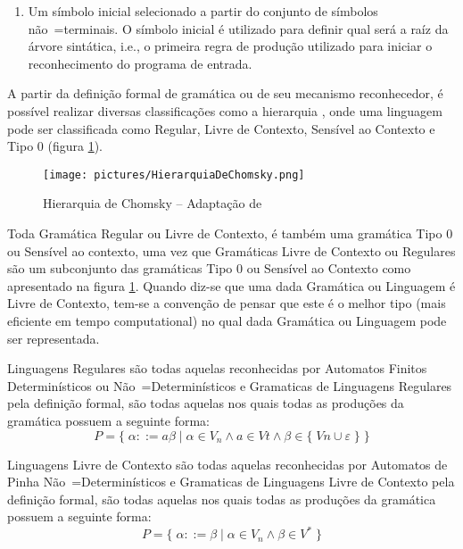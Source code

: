 {\begin{enumerate}
        \item Um símbolo inicial selecionado a partir do conjunto de símbolos não~=terminais.
        O símbolo inicial é utilizado para definir qual será a raíz da árvore sintática,
        i.e.,
        o primeira regra de produção utilizado para iniciar o reconhecimento do programa de entrada.
    \end{enumerate}

    A partir da definição formal de gramática ou de seu mecanismo reconhecedor,
    é possível realizar diversas classificações como a
    hierarquia ,
    onde uma linguagem pode ser classificada como Regular,
    Livre de Contexto,
    Sensível ao Contexto e
    Tipo 0 (figura \ref{fig:pictures/HierarquiaDeChomsky.png}).
    \begin{figure}[H]
    \centering
    \texttt{[image: pictures/HierarquiaDeChomsky.png]}
    \caption{Hierarquia de Chomsky -- Adaptação de }
    \label{fig:pictures/HierarquiaDeChomsky.png}
    \end{figure}

    Toda Gramática Regular ou Livre de Contexto,
    é também uma gramática Tipo 0 ou Sensível ao contexto,
    uma vez que Gramáticas Livre de Contexto ou Regulares são um
    subconjunto das gramáticas Tipo 0 ou Sensível ao Contexto como
    apresentado na figura \ref{fig:pictures/HierarquiaDeChomsky.png}.
    Quando diz-se que uma dada Gramática ou Linguagem é Livre de Contexto,
    tem-se a convenção de pensar que este é o melhor tipo (mais eficiente em tempo
    computational) no qual dada Gramática ou Linguagem pode ser representada.

    Linguagens Regulares são todas aquelas reconhecidas por
    Automatos Finitos Determinísticos ou
    Não~=Determinísticos e
    Gramaticas de Linguagens Regulares pela definição formal,
    são todas aquelas nos quais todas as produções da gramática possuem a seguinte forma:
    $$ P = \{\; \alpha ::= a \beta \;|\; \alpha \in V_n \land a \in Vt
                \land \beta \in \{\; Vn \cup \varepsilon\; \} \;\} $$

    Linguagens Livre de Contexto são todas aquelas
    reconhecidas por Automatos de Pinha
    Não~=Determinísticos e
    Gramaticas de Linguagens Livre de Contexto pela definição formal,
    são todas aquelas nos quais todas as produções da gramática possuem a seguinte forma:
    $$ P = \{\; \alpha ::= \beta \;|\; \alpha \in V_n \land \beta \in V^* \;\} $$

}
